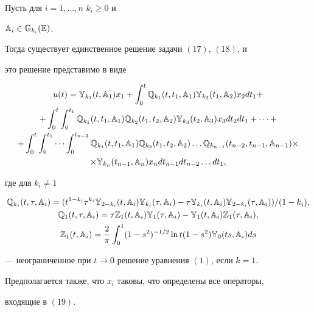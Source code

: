 \begin{thm} Пусть для $i=1,\dotsc,n$\; $k_i\ge 0$ и 


$\Bbb A_i\in\Bbb G_{k_i}(\Bbb E)$. 


Тогда существует единственное решение задачи $(17)$, $(18)$, и  


это решение представимо в виде 


\begin{multline} 


u(t)=\Bbb Y_{k_1}(t,\Bbb A_1)x_1+\int^t_0\Bbb Q_{k_1} 


(t,t_1,\Bbb A_1)\Bbb Y_{k_2}(t_1,\Bbb A_2)x_2dt_1+ \\ 


% 


+\int^t_0\int^{t_1}_0\Bbb Q_{k_1}(t,t_1,\Bbb A_1)\Bbb Q_{k_2} 


(t_1,t_2,\Bbb A_2)\Bbb Y_{k_3}(t_2,\Bbb A_3)x_3dt_2dt_1+\dotsb+ \\ 


% 


+\int^t_0\int^{t_1}_0\dotsb\int^{t_{n-2}}_0\Bbb Q_{k_1}


(t,t_1,\Bbb A_1)\Bbb Q_{k_2}(t_1,t_2,\Bbb A_2)\dotsc 


\Bbb Q_{k_{n-1}}(t_{n-2},t_{n-1},\Bbb A_{n-1}) \times \\


%


\times \Bbb Y_{k_n}(t_{n-1},\Bbb A_n)x_n dt_{n-1}dt_{n-2}\dotsc dt_1, 


\end{multline} 


где для $k_i\ne 1$ 


\begin{gather*} 


\Bbb Q_{k_i}(t,\tau,\Bbb A_i)=(t^{1-k_i}\tau^{k_i} 


\Bbb Y_{2-k_i}(t,\Bbb A_i)\Bbb Y_{k_i}(\tau,\Bbb A_i)- 


\tau\Bbb Y_{k_i}(t,\Bbb A_i)\Bbb Y_{2-k_i}(\tau,\Bbb A_i)) 


/(1-k_i), \\ 


% 


\Bbb Q_1(t,\tau,\Bbb A_i)=\tau\Bbb Z_1(t,\Bbb A_i) 


\Bbb Y_1(\tau,\Bbb A_i)-\Bbb Y_1(t,\Bbb A_i)\Bbb Z_1(\tau,\Bbb A_i),\\ 


% 


\Bbb Z_1(t,\Bbb A_i)=\frac{2}{\pi}\int^1_0(1-s^2)^{-1/2} 


\ln t(1-s^2)\Bbb Y_0(ts,\Bbb A_i)ds 


\end{gather*} 


--- неограниченное при $t\to 0$ решение уравнения $(1)$, если $k=1$. 


Предполагается также, что $x_i$ таковы, что определены все операторы, 


входящие в $(19)$. 


\end{thm} 


